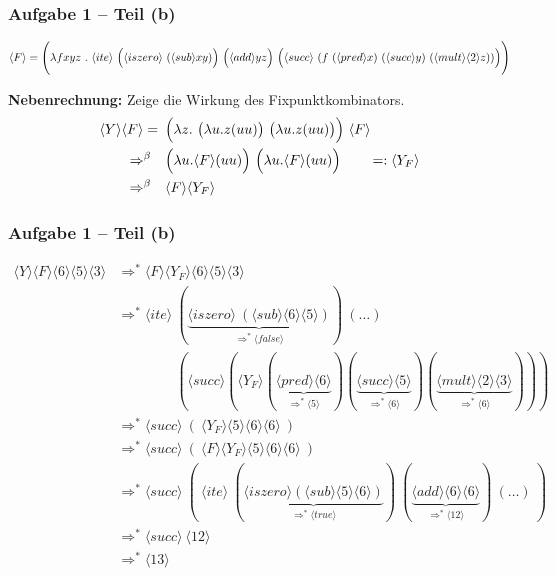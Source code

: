 \documentclass{beamer}
\newcommand{\num}[1]{\ensuremath{\langle #1 \rangle}}
\begin{document}
\begin{frame} \frametitle{Aufgabe 1 -- Teil (b)}
	\tiny
	\begin{equation*}
		\num{F} = \Biggl( \lambda f xyz \ . \ \num{ite} \ \Bigl(\num{iszero} \ (\num{sub} x y )\Bigr) \ \Bigl( \num{add} y z \Bigr) \ \Bigl( \num{succ} \ ( f \ (\num{pred} x) \ (\num{succ} y) \ ( \num{mult} \num{2} z )) \Bigr) \Biggr)
	\end{equation*}
	
	\normalsize
	
	\textbf{Nebenrechnung:} Zeige die Wirkung des Fixpunktkombinators.
	\begin{align*}
		\num{Y} \num{F}
		= \enskip &\Bigl( \lambda z . \ \bigl( \lambda u . z (uu) \bigr) \ \bigl( \lambda u. z (uu) \bigr) \Bigr) \ \num{F} \\
		\Rightarrow^{\beta} \quad &\Bigl( \lambda u . \num{F} (uu) \Bigr) \ \Bigl( \lambda u. \num{F} (uu) \Bigr) \qquad =: \num{Y_F} \\
		\Rightarrow^{\beta} \quad &\num{F} \num{Y_F}
	\end{align*}
\end{frame}
%
\begin{frame} \frametitle{Aufgabe 1 -- Teil (b)}
	\footnotesize
	\begin{align*}
		\num{Y} \num{F} \num{6} \num{5} \num{3} &\Rightarrow^\ast \num{F} \num{Y_F} \num{6} \num{5} \num{3} \\
		&\Rightarrow^\ast \num{ite} \ 
		(\underbrace{\num{iszero} \ (\num{sub}\num{6}\num{5})}_{\Rightarrow^\ast \num{false}}) \ 
		( \dots ) \\
		& \phantom{\Rightarrow^\ast \num{ite}} \ (\num{succ} (\num{Y_F}(\underbrace{\num{pred}\num{6}}_{\Rightarrow^\ast \num{5}})(\underbrace{\num{succ}\num{5}}_{\Rightarrow^\ast \num{6}})(\underbrace{\num{mult}\num{2}\num{3}}_{\Rightarrow^\ast \num{6}}))) \\
		&\Rightarrow^\ast \num{succ} \  ( \ \num{Y_F}\num{5}\num{6}\num{6} \ ) \\
		&\Rightarrow^\ast \num{succ} \ ( \ \num{F} \num{Y_F} \num{5}\num{6}\num{6} \ ) \\
		&\Rightarrow^\ast \num{succ} \ ( \ \num{ite} \  (\underbrace{\num{iszero}(\num{sub}\num{5}\num{6})}_{\Rightarrow^\ast \num{true}}) \ (\underbrace{\num{add}\num{6}\num{6}}_{\Rightarrow^\ast \num{12}})  \ (\dots) \ ) \\
		&\Rightarrow^\ast \num{succ} \ \num{12} \\
		&\Rightarrow^\ast \num{13}
	\end{align*}
\end{frame}
\end{document}
